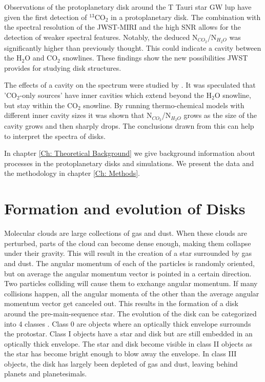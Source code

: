 \documentclass[twoside, single, authoryear, semicolon]{lion-msc}
\newcommand{\3}{$_3$}
\newcommand{\2}{$_2$}
\begin{document}
Observations of the protoplanetary disk around the T Tauri star GW lup have given the first detection of $^{13}$CO$_2$ in a protoplanetary disk. \cite{Grant_2023} The combination with the spectral resolution of the JWST-MIRI and the high SNR allows for the detection of weaker spectral features. Notably, the deduced N$_{CO_2}$/N$_{H_2O}$ was significantly higher than previously thought. This could indicate a cavity between the H$_2$O and CO$_2$ snowlines. These findings show the new possibilities JWST provides for studying disk structures. 

The effects of a cavity on the spectrum were studied by \cite{vlasblom2023midinfraredspectrattauri}. It was speculated that 'CO$_2$-only sources' have inner cavities which extend beyond the H$_2$O snowline, but stay within the CO$_2$ snowline. By running thermo-chemical models with different inner cavity sizes it was shown that N$_{CO_2}$/N$_{H_2O}$ grows as the size of the cavity grows and then sharply drops. The conclusions drawn from this can help to interpret the spectra of disks.

In chapter \ref{Ch: Theoretical Background} we give background information about processes in the protoplanetary disks and simulations. We present the data and the methodology in chapter \ref{Ch: Methods}.



\section{Formation and evolution of Disks}
Molecular clouds are large collections of gas and dust. When these clouds are perturbed, parts of the cloud can become dense enough, making them collapse under their gravity. This will result in the creation of a star surrounded by gas and dust. The angular momentum of each of the particles is randomly oriented, but on average the angular momentum vector is pointed in a certain direction. Two particles colliding will cause them to exchange angular momentum. If many collisions happen, all the angular momenta of the other than the average angular momentum vector get canceled out. This results in the formation of a disk around the pre-main-sequence star.
The evolution of the disk can be categorized into 4 classes \citep{1987ApJ...312..788A}. Class 0 are objects where an optically thick envelope surrounds the protostar. Class I objects have a star and disk but are still embedded in an optically thick envelope. The star and disk become visible in class II objects as the star has become bright enough to blow away the envelope. In class III objects, the disk has largely been depleted of gas and dust, leaving behind planets and planetesimals. 
\end{document}
